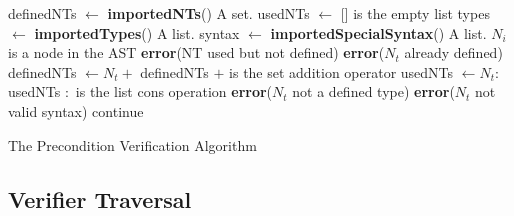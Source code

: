 \begin{algorithm}
\begin{algorithmic}
\State
\State definedNTs $\gets$ \textbf{importedNTs}()
\Comment A set.
\State usedNTs $\gets$ []
\Comment [] is the empty list
\State types $\gets$ \textbf{importedTypes}()
\Comment A list.
\State syntax $\gets$ \textbf{importedSpecialSyntax}()
\Comment A list.
\State
{}
\Comment $N_i$ is a node in the AST
    \State {}
\EndFor
\State
{}
        \State \textbf{error}(NT used but not defined)
    \EndIf
\EndFor
\State
{}
                \State \textbf{error}($N_t$ already defined)
            \Else
                \State definedNTs $\gets N_t +$ definedNTs
                \Comment $+$ is the set addition operator
            \EndIf
        \Else
            \State usedNTs $\gets N_t : $ usedNTs
            \Comment $:$ is the list cons operation
        \EndIf
        \State \textbf{error}($N_t$ not a defined type)
        \State \textbf{error}($N_t$ not valid syntax)
    \Else
        \State continue
    \EndIf
\EndFunction
\end{algorithmic}
\caption{The Precondition Verification Algorithm}
\label{alg:the_precondition_verification_algorithm}
\end{algorithm}



\subsection{Verifier Traversal} %
\label{sub:verifier_traversal}


